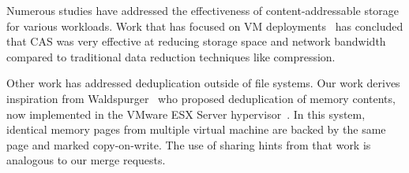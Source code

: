 







Numerous studies have addressed the effectiveness of
content-addressable storage for various workloads.
Work that has focused on VM
deployments~\cite{nath06vmcas,rhea-foundation} has concluded that CAS
was very effective at reducing storage space and network bandwidth
compared to traditional data reduction techniques like
compression.



Other work has addressed deduplication outside of file systems.
Our work derives inspiration from Waldspurger~\cite{waldspurger-osdi}
who proposed deduplication of memory contents, now implemented in the
VMware ESX Server hypervisor~\cite{esx-doc}.  In this system,
identical memory pages from multiple virtual machine are backed by the
same page and marked copy-on-write.  The use of sharing hints from
that work is
analogous to our merge requests.
